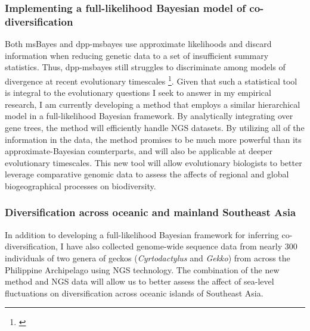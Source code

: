 \subsubsection*{Implementing a full-likelihood Bayesian model of
    co-diversification}
Both msBayes and dpp-msbayes use approximate likelihoods and discard
information when reducing genetic data to a set of insufficient summary
statistics.
Thus, dpp-msbayes still struggles to discriminate among models of divergence at
recent evolutionary timescales \footnote{\label{Oaks14dpp}}.
Given that such a statistical tool is integral to the evolutionary questions
I seek to answer in my empirical research,
I am currently developing a method that employs a similar hierarchical model in
a full-likelihood Bayesian framework.
By analytically integrating over gene trees, the method will efficiently handle
NGS datasets.
By utilizing all of the information in the data, the method promises to be much
more powerful than its approximate-Bayesian counterparts, and will also be
applicable at deeper evolutionary timescales.
This new tool will allow evolutionary biologists to better leverage comparative
genomic data to assess the affects of regional and global biogeographical
processes on biodiversity.

\subsubsection*{Diversification across oceanic and mainland Southeast Asia}
In addition to developing a full-likelihood Bayesian framework for inferring
co-diversification, I have also collected genome-wide sequence data from nearly
300 individuals of two genera of geckos (\emph{Cyrtodactylus} and \emph{Gekko})
from across the Philippine Archipelago using NGS technology.
The combination of the new method and NGS data will allow us to better assess
the affect of sea-level fluctuations on diversification across oceanic islands
of Southeast Asia.

